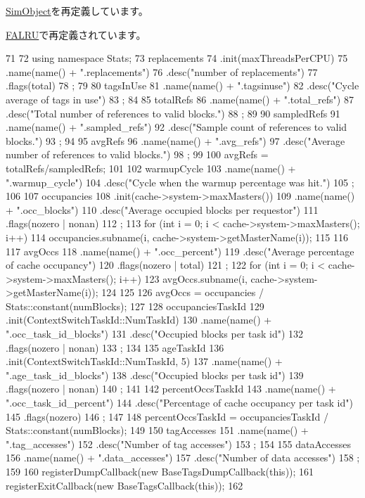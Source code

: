 \hyperlink{classSimObject_a4dc637449366fcdfc4e764cdf12d9b11}{SimObject}を再定義しています。

\hyperlink{classFALRU_a4dc637449366fcdfc4e764cdf12d9b11}{FALRU}で再定義されています。


\begin{DoxyCode}
71 {
72     using namespace Stats;
73     replacements
74         .init(maxThreadsPerCPU)
75         .name(name() + ".replacements")
76         .desc("number of replacements")
77         .flags(total)
78         ;
79 
80     tagsInUse
81         .name(name() + ".tagsinuse")
82         .desc("Cycle average of tags in use")
83         ;
84 
85     totalRefs
86         .name(name() + ".total_refs")
87         .desc("Total number of references to valid blocks.")
88         ;
89 
90     sampledRefs
91         .name(name() + ".sampled_refs")
92         .desc("Sample count of references to valid blocks.")
93         ;
94 
95     avgRefs
96         .name(name() + ".avg_refs")
97         .desc("Average number of references to valid blocks.")
98         ;
99 
100     avgRefs = totalRefs/sampledRefs;
101 
102     warmupCycle
103         .name(name() + ".warmup_cycle")
104         .desc("Cycle when the warmup percentage was hit.")
105         ;
106 
107     occupancies
108         .init(cache->system->maxMasters())
109         .name(name() + ".occ_blocks")
110         .desc("Average occupied blocks per requestor")
111         .flags(nozero | nonan)
112         ;
113     for (int i = 0; i < cache->system->maxMasters(); i++) {
114         occupancies.subname(i, cache->system->getMasterName(i));
115     }
116 
117     avgOccs
118         .name(name() + ".occ_percent")
119         .desc("Average percentage of cache occupancy")
120         .flags(nozero | total)
121         ;
122     for (int i = 0; i < cache->system->maxMasters(); i++) {
123         avgOccs.subname(i, cache->system->getMasterName(i));
124     }
125 
126     avgOccs = occupancies / Stats::constant(numBlocks);
127 
128     occupanciesTaskId
129         .init(ContextSwitchTaskId::NumTaskId)
130         .name(name() + ".occ_task_id_blocks")
131         .desc("Occupied blocks per task id")
132         .flags(nozero | nonan)
133         ;
134 
135     ageTaskId
136         .init(ContextSwitchTaskId::NumTaskId, 5)
137         .name(name() + ".age_task_id_blocks")
138         .desc("Occupied blocks per task id")
139         .flags(nozero | nonan)
140         ;
141 
142     percentOccsTaskId
143         .name(name() + ".occ_task_id_percent")
144         .desc("Percentage of cache occupancy per task id")
145         .flags(nozero)
146         ;
147 
148     percentOccsTaskId = occupanciesTaskId / Stats::constant(numBlocks);
149 
150     tagAccesses
151         .name(name() + ".tag_accesses")
152         .desc("Number of tag accesses")
153         ;
154 
155     dataAccesses
156         .name(name() + ".data_accesses")
157         .desc("Number of data accesses")
158         ;
159 
160     registerDumpCallback(new BaseTagsDumpCallback(this));
161     registerExitCallback(new BaseTagsCallback(this));
162 }
\end{DoxyCode}
